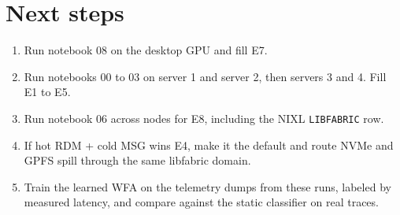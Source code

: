 \documentclass[11pt,letterpaper]{article}
\begin{document}
\section{Next steps}

\begin{enumerate}
\item Run notebook 08 on the desktop GPU and fill E7.
\item Run notebooks 00 to 03 on server 1 and server 2, then servers 3 and 4. Fill E1 to E5.
\item Run notebook 06 across nodes for E8, including the NIXL \texttt{LIBFABRIC} row.
\item If hot RDM + cold MSG wins E4, make it the default and route NVMe and GPFS spill through the same libfabric domain.
\item Train the learned WFA on the telemetry dumps from these runs, labeled by measured latency, and compare against the static classifier on real traces.
\end{enumerate}
\end{document}
